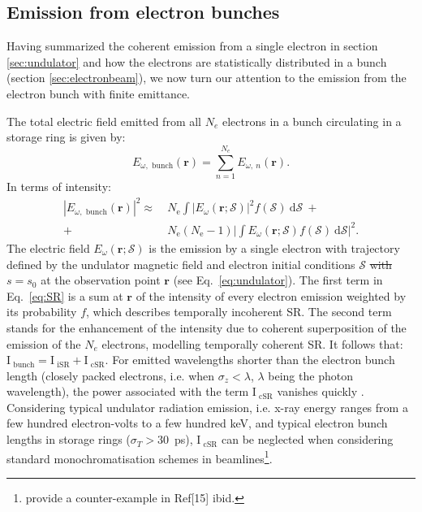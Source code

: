 \documentclass{iucr}              %
\newcommand{\remove}[1]{ {\color{blue} \sout{#1}}}
\begin{document}
\subsection{Emission from electron bunches}

Having summarized the coherent emission from a single electron in section \ref{sec:undulator} and how the electrons are statistically distributed in a bunch (section \ref{sec:electronbeam}), we now turn our attention to the emission from the electron bunch with finite emittance.

The total electric field emitted from all $N_e$ electrons in a bunch circulating in a storage ring is given by: 
\begin{equation}
    E_{\omega,\text{~bunch}}(\textbf{r}) = \sum_{n=1}^{N_e} E_{\omega,~n}(\textbf{r}).
\end{equation}
In terms of intensity: 
\begin{equation}
\begin{split}
|E_{\omega,\text{~bunch}}(\textbf{r})|^2 \approx ~&N_\text{e} \int\big| E_\omega(\textbf{r};\mathcal{S})\big|^2 f(\mathcal{S})~ \text{d}\mathcal{S}~+\\
+~ &N_\text{e}(N_\text{e}-1)\bigg| \int E_\omega(\textbf{r};\mathcal{S}) f(\mathcal{S})~ \text{d}\mathcal{S} \bigg|^2.
\end{split}
\label{eq:SR}
\end{equation}
The electric field $E_\omega(\textbf{r};\mathcal{S})$ is the emission by a single electron with trajectory defined by the undulator magnetic field and electron initial conditions $\mathcal{S}$ \remove{with $s=s_0$} at the observation point $\textbf{r}$ (see Eq.~\ref{eq:undulator}). The first term in Eq.~\ref{eq:SR} is a sum at $\textbf{r}$ of the intensity of every electron emission weighted by its probability $f$, which describes temporally incoherent SR. The second term stands for the enhancement of the intensity due to coherent superposition of the emission of the $N_e$ electrons, modelling temporally coherent SR. It follows that: $\text{I}_\text{~bunch} = \text{I}_\text{~iSR}+\text{I}_\text{~cSR}$. For emitted wavelengths shorter than the electron bunch length (closely packed electrons, i.e. when $\sigma_z < \lambda$, $\lambda$ being the photon wavelength), the power associated with the term $\text{I}_\text{~cSR}$ vanishes quickly \cite{CSR,Wiedemann2015}. Considering typical undulator radiation emission, i.e. x-ray energy ranges from a few hundred electron-volts to a few hundred keV, and typical electron bunch lengths in storage rings ($\sigma_{T}>30$~ps), $\text{I}_\text{~cSR}$ can be neglected when considering standard monochromatisation schemes in beamlines\footnote{ provide a counter-example in Ref[15] ibid.}.
\end{document}
